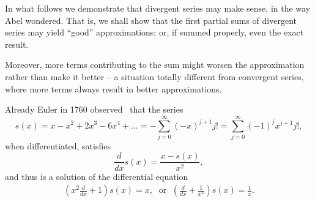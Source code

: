 In what follows we demonstrate that divergent series may make sense, in the way Abel
wondered.
That is, we shall show that the first partial sums of divergent series
may yield ``good'' approximations; or, if summed properly, even the exact result.

Moreover, more terms contributing to the
sum  might worsen the approximation rather than make it better -- a situation totally different
from convergent series, where more terms always result in better approximations.

Already Euler in 1760 observed~\cite{Euler60,Costin-2009} that
the series
\begin{equation}
s(x)= x - x^2+2x^3-6x^4 + \ldots= -\sum_{j=0}^\infty   (-x)^{j+1} j!  = \sum_{j=0}^\infty (-1)^j  x^{j+1}j!,
\label{2011-m-ch-dseess}
\end{equation}
when differentiated, satisfies
\begin{equation}
\frac{d}{dx}s(x)= \frac{x-s(x)}{x^2},
\end{equation}
and thus is a solution of the  differential equation
\begin{equation}
\begin{split}
\left(x^2 \frac{d}{dx} +1\right) s(x) = {x},\;\text{ or }\;
\left(\frac{d}{dx} +\frac{1}{x^2}\right) s(x) = \frac{1}{x}.
\end{split}
\label{2011-m-ch-dsee}
\end{equation}


